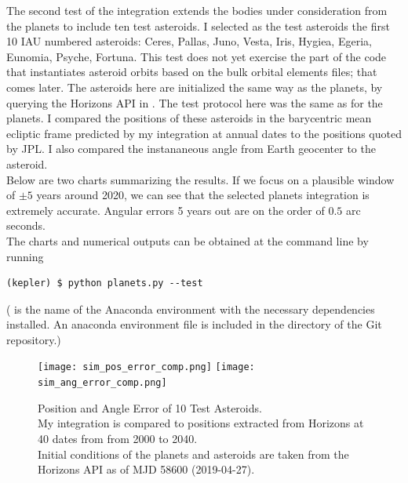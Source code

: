 The second test of the integration extends the bodies under consideration from the planets to include ten test asteroids.
I selected as the test asteroids the first 10 IAU numbered asteroids: Ceres, Pallas, Juno, Vesta, Iris, Hygiea, Egeria, Eunomia, Psyche, Fortuna.
This test does not yet exercise the part of the code that instantiates asteroid orbits based on the bulk orbital elements files; that comes later.
The asteroids here are initialized the same way as the planets, by querying the Horizons API in .
The test protocol here was the same as for the planets.
I compared the positions of these asteroids in the barycentric mean ecliptic frame predicted by my integration at annual dates to the positions quoted by JPL.
I also compared the instananeous angle from Earth geocenter to the asteroid. \\
Below are two charts summarizing the results.
If we focus on a plausible window of $\pm 5$ years around 2020, we can see that the selected planets integration is extremely accurate.
Angular errors 5 years out are on the order of $0.5$ arc seconds.\\
The charts and numerical outputs can be obtained at the command line by running
\begin{lstlisting}[style=CodeSnippet]
(kepler) $ python planets.py --test
\end{lstlisting}
( is the name of the Anaconda environment with the necessary dependencies installed.
An anaconda environment file  is included in the  directory of the Git repository.)
\begin{figure}[hbt!]
\begin{center}
\texttt{[image: sim\_pos\_error\_comp.png]}
\texttt{[image: sim\_ang\_error\_comp.png]}
\caption{Position and Angle Error of 10 Test Asteroids. \\
My integration is compared to positions extracted from Horizons at 40 dates from from 2000 to 2040.\\
Initial conditions of the planets and asteroids are taken from the Horizons API as of MJD 58600 (2019-04-27).}
\end{center}
\end{figure}
\clearpage


